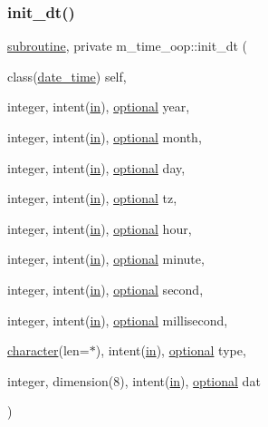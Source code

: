 \subsubsection{\texorpdfstring{init\+\_\+dt()}{init\_dt()}}
{\footnotesize\ttfamily \hyperlink{M__stopwatch_83_8txt_acfbcff50169d691ff02d4a123ed70482}{subroutine}, private m\+\_\+time\+\_\+oop\+::init\+\_\+dt (\begin{DoxyParamCaption}\item[{class(\hyperlink{structm__time__oop_1_1date__time}{date\+\_\+time})}]{self,  }\item[{integer, intent(\hyperlink{M__journal_83_8txt_afce72651d1eed785a2132bee863b2f38}{in}), \hyperlink{option__stopwatch_83_8txt_aa4ece75e7acf58a4843f70fe18c3ade5}{optional}}]{year,  }\item[{integer, intent(\hyperlink{M__journal_83_8txt_afce72651d1eed785a2132bee863b2f38}{in}), \hyperlink{option__stopwatch_83_8txt_aa4ece75e7acf58a4843f70fe18c3ade5}{optional}}]{month,  }\item[{integer, intent(\hyperlink{M__journal_83_8txt_afce72651d1eed785a2132bee863b2f38}{in}), \hyperlink{option__stopwatch_83_8txt_aa4ece75e7acf58a4843f70fe18c3ade5}{optional}}]{day,  }\item[{integer, intent(\hyperlink{M__journal_83_8txt_afce72651d1eed785a2132bee863b2f38}{in}), \hyperlink{option__stopwatch_83_8txt_aa4ece75e7acf58a4843f70fe18c3ade5}{optional}}]{tz,  }\item[{integer, intent(\hyperlink{M__journal_83_8txt_afce72651d1eed785a2132bee863b2f38}{in}), \hyperlink{option__stopwatch_83_8txt_aa4ece75e7acf58a4843f70fe18c3ade5}{optional}}]{hour,  }\item[{integer, intent(\hyperlink{M__journal_83_8txt_afce72651d1eed785a2132bee863b2f38}{in}), \hyperlink{option__stopwatch_83_8txt_aa4ece75e7acf58a4843f70fe18c3ade5}{optional}}]{minute,  }\item[{integer, intent(\hyperlink{M__journal_83_8txt_afce72651d1eed785a2132bee863b2f38}{in}), \hyperlink{option__stopwatch_83_8txt_aa4ece75e7acf58a4843f70fe18c3ade5}{optional}}]{second,  }\item[{integer, intent(\hyperlink{M__journal_83_8txt_afce72651d1eed785a2132bee863b2f38}{in}), \hyperlink{option__stopwatch_83_8txt_aa4ece75e7acf58a4843f70fe18c3ade5}{optional}}]{millisecond,  }\item[{\hyperlink{option__stopwatch_83_8txt_abd4b21fbbd175834027b5224bfe97e66}{character}(len=$\ast$), intent(\hyperlink{M__journal_83_8txt_afce72651d1eed785a2132bee863b2f38}{in}), \hyperlink{option__stopwatch_83_8txt_aa4ece75e7acf58a4843f70fe18c3ade5}{optional}}]{type,  }\item[{integer, dimension(8), intent(\hyperlink{M__journal_83_8txt_afce72651d1eed785a2132bee863b2f38}{in}), \hyperlink{option__stopwatch_83_8txt_aa4ece75e7acf58a4843f70fe18c3ade5}{optional}}]{dat }\end{DoxyParamCaption})\hspace{0.3cm}{\ttfamily [private]}}



